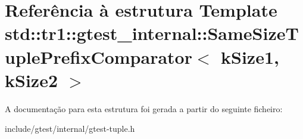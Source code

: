 \hypertarget{structstd_1_1tr1_1_1gtest__internal_1_1SameSizeTuplePrefixComparator}{\section{Referência à estrutura Template std\-:\-:tr1\-:\-:gtest\-\_\-internal\-:\-:Same\-Size\-Tuple\-Prefix\-Comparator$<$ k\-Size1, k\-Size2 $>$}
\label{structstd_1_1tr1_1_1gtest__internal_1_1SameSizeTuplePrefixComparator}
}


A documentação para esta estrutura foi gerada a partir do seguinte ficheiro\-:\begin{DoxyCompactItemize}
\item 
include/gtest/internal/gtest-\/tuple.\-h\end{DoxyCompactItemize}
